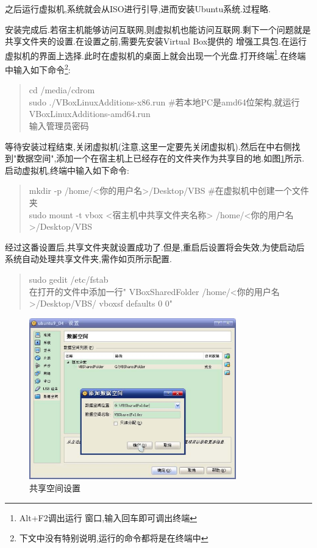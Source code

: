 \documentclass[12pt,a4paper]{article}
\begin{document}
之后运行虚拟机,系统就会从ISO进行引导,进而安装Ubuntu系统.过程略.

安装完成后.若宿主机能够访问互联网,则虚拟机也能访问互联网.剩下一个问题就是共享文件夹的设置.在设置之前,需要先安装Virtual Box提供的
增强工具包.在运行虚拟机的界面上选择.此时在虚拟机的桌面上就会出现一个光盘.打开终端\footnote{Alt+F2调出运行
窗口,输入回车即可调出终端}.在终端中输入如下命令\footnote{下文中没有特别说明,运行的命令都将是在终端中}:
\begin{verse}
cd /media/cdrom\\sudo ./VBoxLinuxAdditions-x86.run \#若本地PC是amd64位架构,就运行VBoxLinuxAdditions-amd64.run\\输入管理员密码
\end{verse}
等待安装过程结束,关闭虚拟机{(注意,这里一定要先关闭虚拟机)}.然后在中右侧找到"数据空间",添加一个在宿主机上已经存在的文件夹作为共享目的地.如图\ref{f_sf}所示.
启动虚拟机,终端中输入如下命令:
\begin{verse}
mkdir -p /home/<你的用户名>/Desktop/VBS \#在虚拟机中创建一个文件夹\\sudo mount -t vbox <宿主机中共享文件夹名称> 
/home/<你的用户名>/Desktop/VBS
\end{verse}
经过这番设置后,共享文件夹就设置成功了.但是,重启后设置将会失效,为使启动后系统自动处理共享文件夹,需作如\pageref{cmd0}页所示配置.
\begin{verse}\label{cmd0}
sudo gedit /etc/fstab\\在打开的文件中添加一行" VBoxSharedFolder  /home/<你的用户名>/Desktop/VBS/  vboxsf  defaults 0 0"
\end{verse}
\begin{figure}[!bthp]
\centering
\includegraphics[width=0.8\textwidth,scale=0.8]{pic/f_vb_setting_sf.eps}
\caption{共享空间设置\label{f_sf}}
\end{figure}
\end{document}
